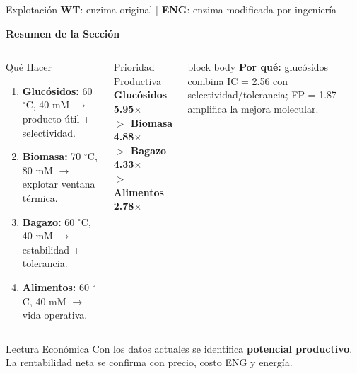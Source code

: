 \begin{frame}{Explotación \hfill{\tiny\color{TextoSuave}\textbf{WT}: enzima original \quad | \quad \textbf{ENG}: enzima modificada por ingeniería}}



{\color{Cian}\bfseries Resumen de la Sección}\par
\vspace{0.07cm}

\begin{columns}[T,onlytextwidth]
\begin{block}{Qué Hacer}
\small
\begin{enumerate}
\item \textbf{Glucósidos:} 60 $^{\circ}$C, 40 mM $\rightarrow$ producto útil + selectividad.
\item \textbf{Biomasa:} 70 $^{\circ}$C, 80 mM $\rightarrow$ explotar ventana térmica.
\item \textbf{Bagazo:} 60 $^{\circ}$C, 40 mM $\rightarrow$ estabilidad + tolerancia.
\item \textbf{Alimentos:} 60 $^{\circ}$C, 40 mM $\rightarrow$ vida operativa.
\end{enumerate}
\end{block}

\begin{alertblock}{Prioridad Productiva}
\centering\small\bfseries
Glucósidos 5.95$\times$\\
$>$ Biomasa 4.88$\times$\\
$>$ Bagazo 4.33$\times$\\
$>$ Alimentos 2.78$\times$
\end{alertblock}

\vspace{0.08cm}
\begin{beamercolorbox}[wd=\linewidth,sep=0.10cm,rounded=true]{block body}
\scriptsize
\textbf{Por qué:} glucósidos combina IC = 2.56 con selectividad/tolerancia; FP = 1.87 amplifica la mejora molecular.
\end{beamercolorbox}
\end{columns}

\vspace{0.08cm}
\begin{block}{Lectura Económica}
\centering\small
Con los datos actuales se identifica \textbf{potencial productivo}. La rentabilidad neta se confirma con precio, costo ENG y energía.
\end{block}

\vfill
\begin{columns}[b,onlytextwidth]
\raggedleft{}
\end{columns}
\end{frame}
